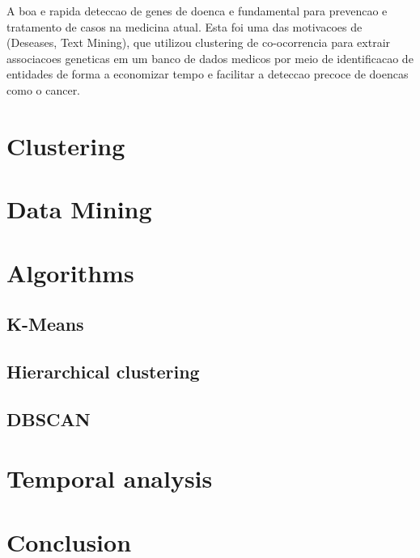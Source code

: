 \documentclass[12pt]{article}
\begin{document}
A boa e rapida deteccao de genes de doenca e fundamental para prevencao e tratamento de casos na medicina atual. Esta foi uma das motivacoes de (Deseases, Text Mining), que utilizou clustering de co-ocorrencia para extrair associacoes geneticas em um banco de dados medicos por meio de identificacao de entidades de forma a economizar tempo e facilitar a deteccao precoce de doencas como o cancer.

\section{Clustering}

\section{Data Mining}

\section{Algorithms}

\subsection{K-Means}

\subsection{Hierarchical clustering}

\subsection{DBSCAN}

\section{Temporal analysis}

\section{Conclusion}





%
\end{document}
